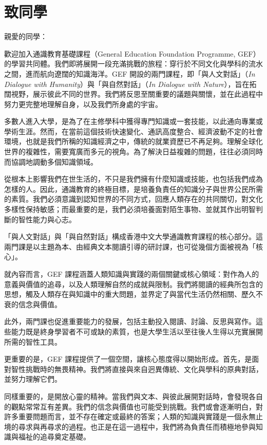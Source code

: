 \documentclass[UTF8,zihao=-4]{ctexart}
\begin{document}
\section*{致同學}
\noindent 親愛的同學：

\noindent 歡迎加入通識教育基礎課程（General Education Foundation Programme, GEF）的學習共同體。我們即將展開一段充滿挑戰的旅程：穿行於不同文化與學科的流水之間，進而航向遼闊的知識海洋。GEF 開設的兩門課程，即「與人文對話」（\textit{In Dialogue with Humanity}）與「與自然對話」（\textit{In Dialogue with Nature}），旨在拓闊視野，展示彼此不同的世界。我們將反思至關重要的議題與關懷，並在此過程中努力更完整地理解自身，以及我們所身處的宇宙。

\noindent 多數人進入大學，是為了在主修學科中獲得專門知識或一套技能，以此通向專業或學術生涯。然而，在當前這個技術快速變化、通訊高度整合、經濟波動不定的社會環境，也就是我們所稱的知識經濟之中，傳統的就業資歷已不再足夠。理解全球化世界的複雜性，需要寬廣而多元的視角。為了解決日益複雜的問題，往往必須同時而協調地調動多個知識領域。

\noindent 從根本上影響我們在世生活的，不只是我們擁有什麼知識或技能，也包括我們成為怎樣的人。因此，通識教育的終極目標，是培養負責任的知識分子與世界公民所需的素質。我們必須意識到認知世界的不同方式，回應人類存在的共同關切，對文化多樣性保持敏感；而最重要的是，我們必須培養面對陌生事物、並就其作出明智判斷的智性能力與心志。

\noindent 「與人文對話」與「與自然對話」構成香港中文大學通識教育課程的核心部分。這兩門課是以主題為本、由經典文本閱讀引導的研討課，也可從幾個方面被視為「核心」。

\noindent 就內容而言，GEF 課程涵蓋人類知識與實踐的兩個關鍵或核心領域：對作為人的意義與價值的追尋，以及人類理解自然的成就與限制。我們將閱讀的經典所包含的思想，觸及人類存在與知識中的重大問題，並界定了與當代生活仍然相關、歷久不衰的信念與價值。

\noindent 此外，兩門課也促進重要能力的發展，包括主動投入閱讀、討論、反思與寫作。這些能力既是終身學習者不可或缺的素質，也是大學生活以至往後人生得以充實展開所需的智性工具。

\noindent 更重要的是，GEF 課程提供了一個空間，讓核心態度得以開始形成。首先，是面對智性挑戰時的無畏精神。我們將直接與來自迥異傳統、文化與學科的原典對話，並努力理解它們。

\noindent 同樣重要的，是開放心靈的精神。當我們與文本、與彼此展開對話時，會發現各自的觀點常常互有差異。我們的信念與價值也可能受到挑戰。我們或會逐漸明白，對許多重要問題而言，並不存在確定或最終的答案；人類的知識與實踐是一個永無止境的尋求與再尋求的過程。也正是在這一過程中，我們將為負責任而積極地參與知識與福祉的追尋奠定基礎。
\end{document}
